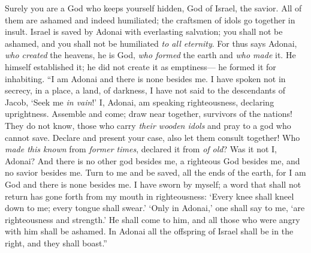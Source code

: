 \begin{biblechapter}
\verse Surely you are a God who keeps yourself hidden, 
God of Israel, the savior.
\verse All of them are ashamed and indeed humiliated; 
the craftsmen of idols go together in insult.
\verse Israel is saved by Adonai with everlasting salvation; 
you shall not be ashamed, 
and you shall not be humiliated \textit{to all eternity}.
\verse For thus says Adonai, \textit{who created} the heavens, 
he is God, \textit{who formed} the earth 
and \textit{who made} it. 
He himself established it; 
he did not create it as emptiness— 
he formed it for inhabiting. “I am Adonai and there is none besides me.
\verse I have spoken not in secrecy, in a place, a land, of darkness, 
I have not said to the descendants of Jacob, ‘Seek me \textit{in vain}!’ 
I, Adonai, am speaking righteousness, 
declaring uprightness.
\verse Assemble and come; 
draw near together, survivors of the nations! 
They do not know, those who carry \textit{their wooden idols} 
and pray to a god who cannot save.
\verse Declare and present your case, 
also let them consult together! 
Who \textit{made this known} from \textit{former times}, 
declared it from \textit{of old}? 
Was it not I, Adonai? 
And there is no other god besides me, 
a righteous God besides me, 
and no savior besides me.
\verse Turn to me and be saved, all the ends of the earth, 
for I am God and there is none besides me.
\verse I have sworn by myself; 
a word that shall not return has gone forth from my mouth in righteousness: 
‘Every knee shall kneel down to me; 
every tongue shall swear.’
\verse ‘Only in Adonai,’ one shall say to me, ‘are righteousness and strength.’ 
He shall come to him, and all those who were angry with him shall be ashamed.
\verse In Adonai all the offspring of Israel shall be in the right, 
and they shall boast.”
\end{biblechapter}

